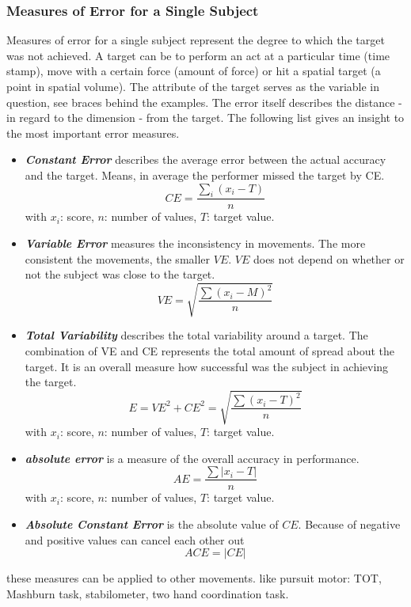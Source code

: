 \subsubsection{Measures of Error for a Single Subject}
Measures of error for a single subject represent the degree to which the target was not achieved. A target can be to perform an act at a particular time (time stamp), move with a certain force (amount of force) or hit a spatial target (a point in spatial volume). The attribute of the target serves as the variable in question, see braces behind the examples. The error itself describes the distance - in regard to the dimension - from the target. The following list gives an insight to the most important error measures.
\begin{itemize}
	\item \textbf{\textit{Constant Error}} describes the average error between the actual accuracy and the target. Means, in average the performer missed the target by CE.
	\begin{equation}
		CE=\frac{\sum_i(x_i-T)}{n}
	\end{equation}
	\label{eq:constanterror}
	with $x_i$: score, $n$: number of values, $T$: target value.
	\item \textbf{\textit{Variable Error}} measures the inconsistency in movements. The more consistent the movements, the smaller $VE$. $VE$ does not depend on whether or not the subject was close to the target.
	\begin{equation}
		VE=\sqrt{\frac{\sum(x_i-M)^2}{n}}	
	\end{equation}
	\item \textbf{\textit{Total Variability}} describes the total variability around a target. The combination of VE and CE represents the total amount of spread about the target. It is an overall measure how successful was the subject in achieving the target.
	\begin{equation}
		E=VE^2+CE^2=\sqrt{\frac{\sum(x_i-T)^2}{n}}
	\end{equation}
	with $x_i$: score, $n$: number of values, $T$: target value.
	\item \textbf{\textit{absolute error}} is a measure of the overall accuracy in performance.
	\begin{equation}
		AE=\frac{\sum|x_i-T|}{n}
	\end{equation}
	with $x_i$: score, $n$: number of values, $T$: target value.
	\item \textbf{\textit{Absolute Constant Error}} is the absolute value of $CE$. Because of negative and positive values can cancel each other out
	\begin{equation}
		ACE = |CE|
	\end{equation}
\end{itemize}
these measures can be applied to other movements. like pursuit motor: TOT, Mashburn task, stabilometer, two hand coordination task.

